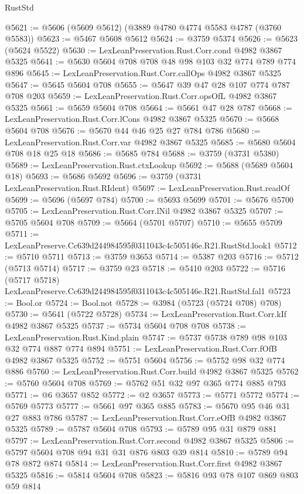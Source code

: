 \begin{lexlean}{RustStd}
\begin{coremodule}
@5621 := @5606 (@5609 @5612) (@3889 @4780 @4774 @5583 @4787 (@3760 @5583))
@5623 := @5467 @5608 @5612
@5624 := @3759 @5374
@5626 := @5623 (@5624 @5522)
@5630 := LexLeanPreservation.Rust.Corr.cond @4982 @3867 @5325
@5641 := @5630 @5604 @708 @708 @48 @98 @103 @32 @774 @789 @774 @896
@5645 := LexLeanPreservation.Rust.Corr.callOps @4982 @3867 @5325
@5647 := @5645 @5604 @708
@5655 := @5647 @39 @47 @28 @107 @774 @787 @708 @203
@5659 := LexLeanPreservation.Rust.Corr.opsOfL @4982 @3867 @5325
@5661 := @5659 @5604 @708
@5664 := @5661 @47 @28 @787
@5668 := LexLeanPreservation.Rust.Corr.lCons @4982 @3867 @5325
@5670 := @5668 @5604 @708
@5676 := @5670 @44 @46 @25 @27 @784 @786
@5680 := LexLeanPreservation.Rust.Corr.var @4982 @3867 @5325
@5685 := @5680 @5604 @708 @18 @25 @18
@5686 := @5685 @784
@5688 := @3759 (@3731 @5380)
@5689 := LexLeanPreservation.Rust.ctxLookup
@5692 := @5688 (@5689 @5604 @18)
@5693 := @5686 @5692
@5696 := @3759 (@3731 LexLeanPreservation.Rust.RIdent)
@5697 := LexLeanPreservation.Rust.readOf
@5699 := @5696 (@5697 @784)
@5700 := @5693 @5699
@5701 := @5676 @5700
@5705 := LexLeanPreservation.Rust.Corr.lNil @4982 @3867 @5325
@5707 := @5705 @5604 @708
@5709 := @5664 (@5701 @5707)
@5710 := @5655 @5709
@5711 := LexLeanPreserve.Cc639d244984595f0311043c4c505146e.R21.RustStd.look1
@5712 := @5710 @5711
@5713 := @3759 @3653
@5714 := @5387 @203
@5716 := @5712 (@5713 @5714)
@5717 := @3759 @23
@5718 := @5410 @203
@5722 := @5716 (@5717 @5718) LexLeanPreserve.Cc639d244984595f0311043c4c505146e.R21.RustStd.fal1
@5723 := Bool.or
@5724 := Bool.not
@5728 := @3984 (@5723 (@5724 @708) @708)
@5730 := @5641 (@5722 @5728)
@5734 := LexLeanPreservation.Rust.Corr.kIf @4982 @3867 @5325
@5737 := @5734 @5604 @708 @708
@5738 := LexLeanPreservation.Rust.Kind.plain
@5747 := @5737 @5738 @789 @98 @103 @32 @774 @887 @774 @894
@5751 := LexLeanPreservation.Rust.Corr.fOfB @4982 @3867 @5325
@5752 := @5751 @5604
@5756 := @5752 @98 @32 @774 @886
@5760 := LexLeanPreservation.Rust.Corr.build @4982 @3867 @5325
@5762 := @5760 @5604 @708
@5769 := @5762 @51 @32 @97 @365 @774 @885 @793
@5771 := @6 @3657 @852
@5772 := @2 @3657
@5773 := @5771 @5772
@5774 := @5769 @5773
@5777 := @5661 @97 @365 @885
@5783 := @5670 @95 @46 @31 @27 @883 @786
@5787 := LexLeanPreservation.Rust.Corr.eOfB @4982 @3867 @5325
@5789 := @5787 @5604 @708
@5793 := @5789 @95 @31 @879 @881
@5797 := LexLeanPreservation.Rust.Corr.second @4982 @3867 @5325
@5806 := @5797 @5604 @708 @94 @31 @31 @876 @803 @39 @814
@5810 := @5789 @94 @78 @872 @874
@5814 := LexLeanPreservation.Rust.Corr.first @4982 @3867 @5325
@5816 := @5814 @5604 @708
@5823 := @5816 @93 @78 @107 @869 @803 @59 @814

\end{coremodule}
\end{lexlean}
